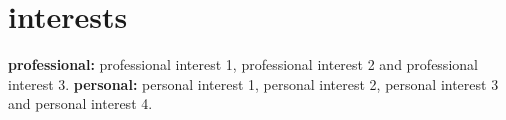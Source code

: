 \documentclass{article}
\begin{document}

\section{interests}
  \vspace{-0.2cm}

\textbf{professional:} professional interest 1, professional interest 2 and professional interest 3. \textbf{personal:} personal interest 1, personal interest 2, personal interest 3 and personal interest 4.

\end{document}
